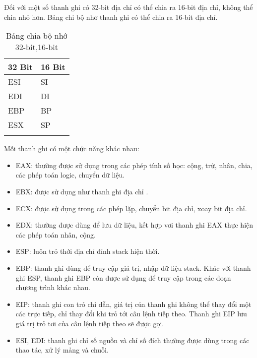 			Đối với một số thanh ghi có 32-bit địa chỉ có thể chia ra 16-bit địa chỉ, không thể chia nhỏ hơn. Bảng chi bộ nhơ thanh ghi có thể chia ra 16-bit địa chỉ.\\
			\begin{longtable}{ | m{3cm} | m{3cm} | }
			\hline
				32 Bit & 16 Bit\\
			\hline
			\hline
				ESI & SI\\
			\hline			
				EDI & DI\\
			\hline		
				EBP & BP\\		
			\hline
				ESX & SP\\
			\hline
			\caption{Bảng chia bộ nhớ 32-bit,16-bit}
			\label{table:tbthanhghi}
		\end{longtable}
		
	Mỗi thanh ghi có một chức năng khác nhau: 
\begin{itemize}
	\renewcommand{\labelitemi}{\textbullet}
	\item	EAX: thường được sử dụng trong các phép tính số học: cộng, trừ, nhân, chia, các phép toán logic, chuyển dữ liệu.
	\item EBX: được sử dụng như thanh ghi địa chỉ .
\item	ECX: được sử dụng trong các phép lặp, chuyển bit địa chỉ, xoay bit địa chỉ.
\item	EDX: thường được dùng để lưu dữ liệu, kết hợp vơi thanh ghi EAX thực hiện các phép toán nhân, cộng.
\item	ESP: luôn trỏ thới địa chỉ đỉnh stack hiện thời.
\item	EBP: thanh ghi dùng để truy cập giá trị, nhập dữ liệu stack. Khác với thanh ghi ESP, thanh ghi EBP còn được sử dụng để truy cập trong các đoạn chương trình khác nhau.
\item	EIP: thanh ghi con trỏ chỉ dẫn, giá trị của thanh ghi không thể thay đổi một các trực tiếp, chỉ thay đổi khi trỏ tới câu lệnh tiếp theo. Thanh ghi EIP lưu giá trị trỏ tơi của câu lệnh tiếp theo sẽ được gọi. 
\item	ESI, EDI: thanh ghi chỉ số nguồn và chỉ số đích thường được dùng trong các thao tác, xử lý mảng và chuỗi.
\end{itemize}	
	
